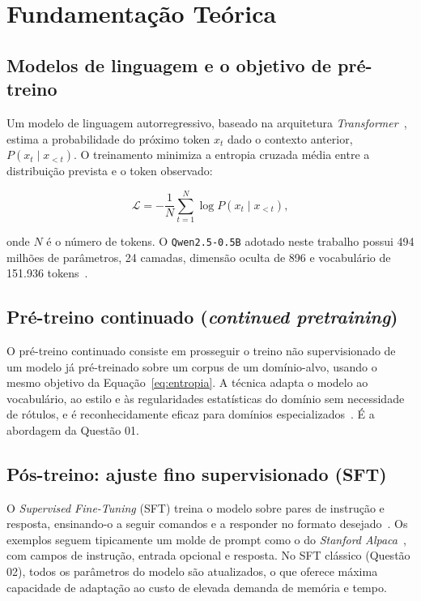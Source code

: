 \section{Fundamentação Teórica}

\subsection{Modelos de linguagem e o objetivo de pré-treino}

Um modelo de linguagem autorregressivo, baseado na arquitetura
\textit{Transformer}~\cite{vaswani2017attention}, estima a probabilidade do próximo
token $x_t$ dado o contexto anterior, $P(x_t \mid x_{<t})$. O treinamento minimiza a
entropia cruzada média entre a distribuição prevista e o token observado:

\begin{equation}
  \mathcal{L} = -\frac{1}{N} \sum_{t=1}^{N} \log P(x_t \mid x_{<t}),
  \label{eq:entropia}
\end{equation}

\noindent onde $N$ é o número de tokens. O \texttt{Qwen2.5-0.5B} adotado neste
trabalho possui 494 milhões de parâmetros, 24 camadas, dimensão oculta de 896 e
vocabulário de 151.936 tokens~\cite{qwen2025}.

\subsection{Pré-treino continuado (\textit{continued pretraining})}

O pré-treino continuado consiste em prosseguir o treino não supervisionado de um
modelo já pré-treinado sobre um corpus de um domínio-alvo, usando o mesmo objetivo
da Equação~\ref{eq:entropia}. A técnica adapta o modelo ao vocabulário, ao estilo e
às regularidades estatísticas do domínio sem necessidade de rótulos, e é
reconhecidamente eficaz para domínios especializados~\cite{gururangan2020dont}. É a
abordagem da Questão 01.

\subsection{Pós-treino: ajuste fino supervisionado (SFT)}

O \textit{Supervised Fine-Tuning} (SFT) treina o modelo sobre pares de instrução e
resposta, ensinando-o a seguir comandos e a responder no formato
desejado~\cite{ouyang2022instructgpt}. Os exemplos seguem tipicamente um molde de
prompt como o do \textit{Stanford Alpaca}~\cite{taori2023alpaca}, com campos de
instrução, entrada opcional e resposta. No SFT clássico (Questão 02), todos os
parâmetros do modelo são atualizados, o que oferece máxima capacidade de adaptação
ao custo de elevada demanda de memória e tempo.

